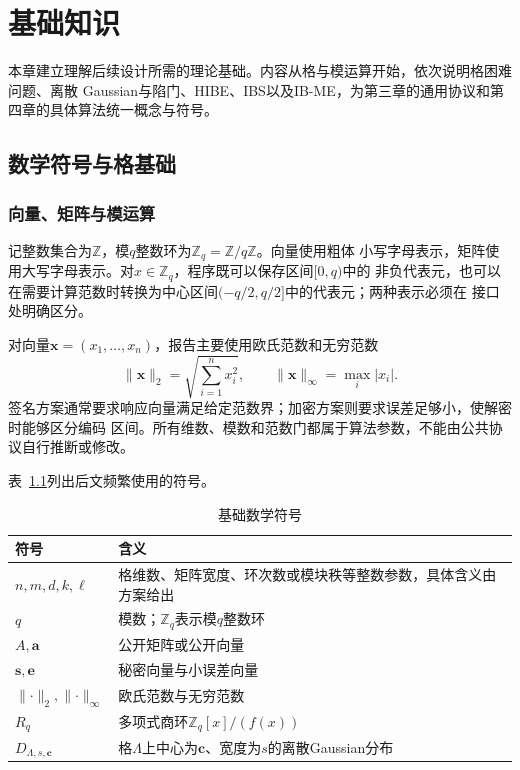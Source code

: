 \chapter{基础知识}

本章建立理解后续设计所需的理论基础。内容从格与模运算开始，依次说明格困难问题、离散
Gaussian与陷门、HIBE、IBS以及IB-ME，为第三章的通用协议和第四章的具体算法统一概念与符号。

\section{数学符号与格基础}

\subsection{向量、矩阵与模运算}

记整数集合为$\mathbb Z$，模$q$整数环为$\mathbb Z_q=\mathbb Z/q\mathbb Z$。向量使用粗体
小写字母表示，矩阵使用大写字母表示。对$x\in\mathbb Z_q$，程序既可以保存区间$[0,q)$中的
非负代表元，也可以在需要计算范数时转换为中心区间$(-q/2,q/2]$中的代表元；两种表示必须在
接口处明确区分。

对向量$\mathbf x=(x_1,\ldots,x_n)$，报告主要使用欧氏范数和无穷范数
\[
 \lVert\mathbf x\rVert_2=\sqrt{\sum_{i=1}^{n}x_i^2},
 \qquad
 \lVert\mathbf x\rVert_\infty=\max_i|x_i|.
\]
签名方案通常要求响应向量满足给定范数界；加密方案则要求误差足够小，使解密时能够区分编码
区间。所有维数、模数和范数门都属于算法参数，不能由公共协议自行推断或修改。

表~\ref{tab:foundation-symbols}列出后文频繁使用的符号。

\begin{table}[H]
\centering\small
\caption{基础数学符号}
\label{tab:foundation-symbols}
\begin{tabularx}{\textwidth}{@{}p{}X@{}}
\toprule
\rowcolor{black!8} 符号 & 含义 \\
\midrule
$n,m,d,k,\ell$ & 格维数、矩阵宽度、环次数或模块秩等整数参数，具体含义由方案给出 \\
$q$ & 模数；$\mathbb Z_q$表示模$q$整数环 \\
$A,\mathbf a$ & 公开矩阵或公开向量 \\
$\mathbf s,\mathbf e$ & 秘密向量与小误差向量 \\
$\lVert\cdot\rVert_2,\lVert\cdot\rVert_\infty$ & 欧氏范数与无穷范数 \\
$R_q$ & 多项式商环$\mathbb Z_q[x]/(f(x))$ \\
$D_{\Lambda,s,\mathbf c}$ & 格$\Lambda$上中心为$\mathbf c$、宽度为$s$的离散Gaussian分布 \\
\bottomrule
\end{tabularx}
\end{table}


